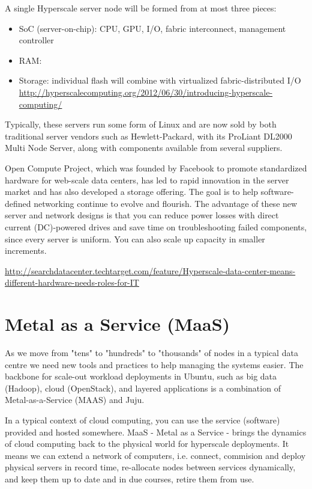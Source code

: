 A single Hyperscale server node will be formed from at most three pieces:
\begin{itemize}
  \item SoC (server-on-chip): CPU, GPU, I/O, fabric interconnect, management
  controller
  
  \item RAM: 
  
  \item Storage:  individual flash will combine with virtualized
  fabric-distributed I/O
  \url{http://hyperscalecomputing.org/2012/06/30/introducing-hyperscale-computing/}
\end{itemize}
Typically, these servers run some form of Linux and are now sold by both
traditional server vendors such as Hewlett-Packard, with its ProLiant DL2000
Multi Node Server, along with components available from several suppliers. 

Open Compute Project,  which was founded by Facebook to promote standardized
hardware for web-scale data centers, has led to rapid innovation in the server
market and has also developed a storage offering. 
The goal is to help  software-defined networking continue to evolve and
flourish. The advantage of these new server and network designs is that you can
reduce power losses with direct current (DC)-powered drives and save time on
troubleshooting failed components, since every server is uniform. You can also
scale up capacity in smaller increments.  
 

\url{http://searchdatacenter.techtarget.com/feature/Hyperscale-data-center-means-different-hardware-needs-roles-for-IT}


\section{Metal as a Service (MaaS)}
\label{sec:MaaS}

As we move from "tens" to "hundreds" to "thousands" of nodes in a typical data
centre we need new tools and practices to help managing the systems easier.
The backbone for scale-out workload deployments in Ubuntu, such as big data
(Hadoop), cloud (OpenStack), and layered applications is a combination of
Metal-as-a-Service (MAAS) and Juju.

In a typical context of cloud computing, you can use the service (software)
provided and hosted somewhere. MaaS - Metal as a Service - brings the dynamics
of cloud computing back to the physical world for hyperscale deployments. It
means we can extend a network of computers, i.e. connect, commision and deploy
physical servers in record time, re-allocate nodes between services dynamically,
and keep them up to date and in due courses, retire them from use.

